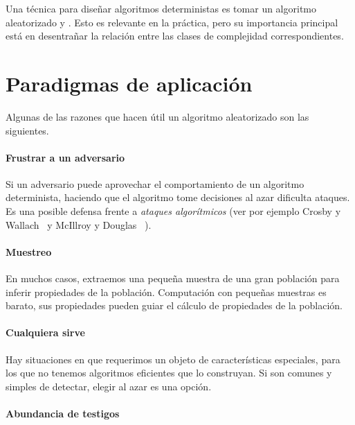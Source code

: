    Una técnica para diseñar algoritmos deterministas
   es tomar un algoritmo aleatorizado y .
   Esto es relevante en la práctica,
   pero su importancia principal
   está en desentrañar la relación
   entre las clases de complejidad correspondientes.

\section{Paradigmas de aplicación}
\label{sec:paradigmas-aleatorizado}

  Algunas de las razones que hacen útil un algoritmo aleatorizado
  son las siguientes.

\paragraph{Frustrar a un adversario}

  Si un adversario puede aprovechar el comportamiento
  de un algoritmo determinista,
  haciendo que el algoritmo tome decisiones al azar
  dificulta ataques.
  Es una posible defensa frente a \emph{ataques algorítmicos}
  (ver por ejemplo Crosby y Wallach~%
    \cite{crosby03:_DoS_algo_compl_attack}
   y McIllroy y Douglas~%
    \cite{mcillroy99:_killer_adver_quicksort}).

\paragraph{Muestreo}

  En muchos casos,
  extraemos una pequeña muestra de una gran población
  para inferir propiedades de la población.
  Computación con pequeñas muestras es barato,
  sus propiedades pueden guiar el cálculo de propiedades de la población.

\paragraph{Cualquiera sirve}

  Hay situaciones en que requerimos un objeto de características especiales,
  para los que no tenemos algoritmos eficientes que lo construyan.
  Si son comunes y simples de detectar,
  elegir al azar es una opción.

\paragraph{Abundancia de testigos}

